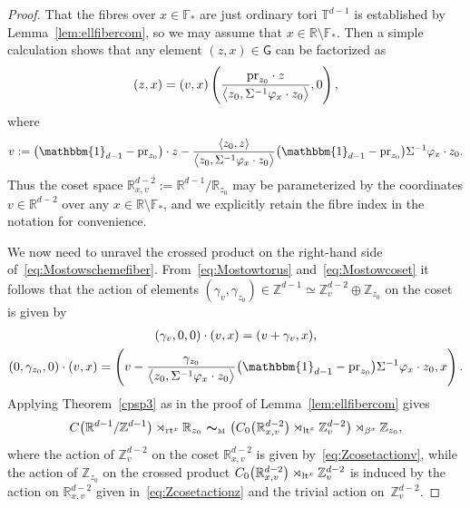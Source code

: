 \documentclass[10pt,a4paper]{amsart}
\numberwithin{equation}{section}
\newcommand{\Z}{\zed}
\newcommand{\F}{\mathbb{F}}
\newcommand{\mbf}[1]{{\boldsymbol {#1} }}
\newcommand{\unit}{\mathbbm{1}} 			%
\newcommand{\sfG}{\mathsf{G}}
\newcommand{\lt}{{\rm lt}}
\newcommand{\rt}{{\rm rt}}
\newcommand{\R}{\real}
\newcommand{\zed}{{\mathbb Z}} %
\newcommand{\real}{{\mathbb R}} %
\newcommand{\torus}{{\mathbb T}} %
\newcommand{\proj}{{\rm pr}}
\begin{document}
\begin{proof}
That the fibres over $x\in\F_*$ are just ordinary tori $\torus^{d-1}$
is established by Lemma~\ref{lem:ellfibercom}, so we may assume that $x\in\R\setminus\F_*$. Then a simple
calculation shows that any element $(z,x)\in\sfG$ can be factorized as
\[
(z,x) = (v,x) \left(\frac{\proj_{ z_0}\cdot z}{\big\langle z_0,\Sigma^{-1} \varphi_x\cdot z_0\big\rangle} , 0\right) ,
\]
where
\begin{gather}\label{eq:Mostowcoset}
v:=\big(\unit_{d-1}-\proj_{ z_0}\big)\cdot z - \frac{\langle{ z_0},
 z\rangle}{\big\langle{ z_0},\Sigma^{-1} \varphi_x\cdot z_0\big\rangle}
\big(\unit_{d-1}-\proj_{ z_0}\big) \Sigma^{-1} \varphi_x\cdot z_0 .
\end{gather}
Thus the coset space $\R_{x,v}^{d-2}:=\R^{d-1}/\R_{ z_0}$ may be
parameterized by the coordinates $v\in\R^{d-2}$ over any
$x\in\R\setminus\F_*$, and we explicitly retain the fibre index in the
notation for convenience.

We now need to unravel the crossed product
on the right-hand side of~\eqref{eq:Mostowschemefiber}.
From~\eqref{eq:Mostowtorus} and~\eqref{eq:Mostowcoset} it follows that the action of elements
$(\gamma_v,\gamma_{ z_0})\in\Z^{d-1}\simeq\Z_v^{d-2}\oplus\Z_{
 z_0}$ on the coset is given by
\begin{gather}\label{eq:Zcosetactionv}
(\gamma_v,0,0)\cdot (v,x) = (v+\gamma_v,x) , \\
(0,\gamma_{ z_0},0)\cdot (v,x) = \left(v-\frac{
 \gamma_{ z_0}}{\big\langle{ z_0},\Sigma^{-1} \varphi_x\cdot z_0\big\rangle}
\big(\unit_{d-1}-\proj_{ z_0}\big) \Sigma^{-1} \varphi_x\cdot
 z_0 , x\right) .
\label{eq:Zcosetactionz}\end{gather}
Applying
Theorem~\ref{cpsp3} as in the proof of Lemma~\ref{lem:ellfibercom} gives
\begin{gather*}%
C\big(\R^{d-1}/\Z^{d-1}\big)\rtimes_{\rt^x}\real_{ z_0}
\ \mbf\sim_{\text{\tiny M}} \
\big(C_0\big(\real^{d-2}_{x,v}\big)\rtimes_{\lt^x}\Z^{d-2}_{v}\big) \rtimes_{\beta^x} \Z_{ z_0} ,
\end{gather*}
where the action of $\Z^{d-2}_v$ on the coset $\R^{d-2}_{x,v}$ is
given by~\eqref{eq:Zcosetactionv}, while the action of $\Z_{ z_0}$ on the crossed product
$C_0\big(\real^{d-2}_{x,v}\big)\rtimes_{\lt^x}\Z^{d-2}_{v}$ is induced by the
action on $\real^{d-2}_{x,v}$ given in~\eqref{eq:Zcosetactionz} and the trivial action on~$\Z^{d-2}_{v}$.


\end{proof}
\end{document}
